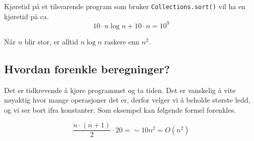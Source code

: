 \documentclass[twocolumn]{article}
\begin{document}
Kjøretid på et tilsvarende program som bruker \verb!Collections.sort()! vil ha en kjøretid på ca. \[ 10 \cdot  n \log n + 10 \cdot  n = 10^{9} \]

Når \( n \) blir stor, er alltid \( n \log n  \) raskere enn \( n^2 \).

\subsection{Hvordan forenkle beregninger?}
Det er tidkrevende å kjøre programmet og ta tiden. Det er vanskelig å vite nøyaktig hvor mange operasjoner det er, derfor velger vi å beholde største ledd, og vi ser bort ifra konstanter. Som eksempel kan følgende formel forenkles.

\[ \frac{n \cdot  \left( n + 1 \right)}{2} \cdot  20 = \sim 10 n^2 = O\left( n^2 \right) \]
\end{document}
